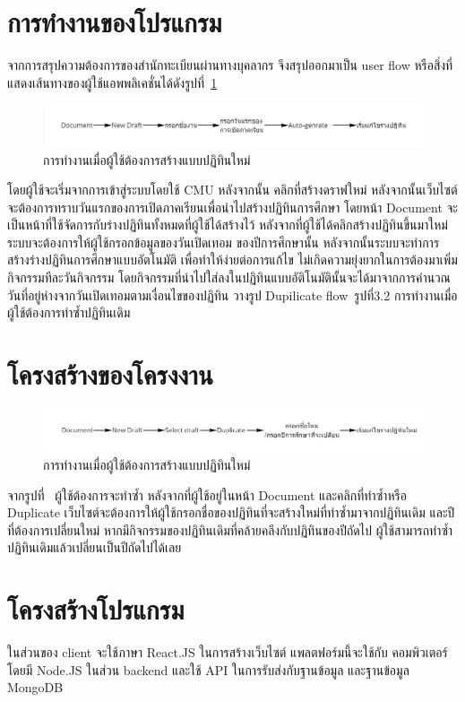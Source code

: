 \section{การทำงานของโปรแกรม}
จากการสรุปความต้องการของสำนักทะเบียนผ่านทางบุคลากร จึงสรุปออกมาเป็น user flow หรือสิ่งที่แสดงเส้นทางของผู้ใช้แอพพลิเคชั่นได้ดังรูปที่~\ref{fig:user-flow-new}

\begin{figure}[h]
\centering
\includegraphics[width=1\textwidth]{pic3.1.jpg}
\caption{การทำงานเมื่อผู้ใช้ต้องการสร้างแบบปฏิทินใหม่}
\label{fig:user-flow-new}
\end{figure}

โดยผู้ใช้จะเริ่มจากการเข้าสู่ระบบโดยใช้ CMU  หลังจากนั้น คลิกที่สร้างดราฟใหม่ 
หลังจากนั้นเว็บไซต์จะต้องการทราบวันแรกของการเปิดภาคเรียนเพื่อนำไปสร้างปฏิทินการศึกษา
โดยหน้า Document จะเป็นหน้าที่ใช้จัดการกับร่างปฏิทินทั้งหมดที่ผู้ใช้ได้สร้างไว้
หลังจากที่ผู้ใช้ได้คลิกสร้างปฏิทินขึ้นมาใหม่ ระบบจะต้องการให้ผู้ใช้กรอกข้อมูลของวันเปิดเทอม
ของปีการศึกษานั้น หลังจากนั้นระบบจะทำการสร้างร่างปฏิทินการศึกษาแบบอัตโนมัติ
เพื่อทำให้ง่ายต่อการแก้ไข ไม่เกิดความยุ่งยากในการต้องมาเพิ่มกิจกรรมทีละวันกิจกรรม
โดยกิจกรรมที่นำไปใส่ลงในปฏิทินแบบอัติโนมัตินั้นจะได้มาจากการคำนวณ
วันที่อยู่ห่างจากวันเปิดเทอมตามเงื่อนไขของปฏิทิน
 วางรูป Dupilicate flow\
 รูปที่3.2 การทำงานเมื่อผู้ใช้ต้องการทำซ้ำปฏิทินเดิม

\section{โครงสร้างของโครงงาน}

\begin{figure}[h]
\centering
\includegraphics[width=1\textwidth]{pic3.2.jpg}
\caption{การทำงานเมื่อผู้ใช้ต้องการสร้างแบบปฏิทินใหม่}
\end{figure}

จากรูปที่~ ผู้ใช้ต้องการจะทำซ้ำ หลังจากที่ผู้ใช้อยู่ในหน้า Document และคลิกที่ทำซ้ำหรือ Duplicate
เว็บไซต์จะต้องการให้ผู้ใช้กรอกชื่อของปฏิทินที่จะสร้างใหม่ที่ทำซ้ำมาจากปฏิทินเดิม
และปีที่ต้องการเปลี่ยนใหม่ หากมีกิจกรรมของปฏิทินเดิมที่คล้ายคลึงกับปฏิทินของปีถัดไป 
ผู้ใช้สามารถทำซ้ำปฏิทินเดิมแล้วเปลี่ยนเป็นปีถัดไปได้เลย

\section{โครงสร้างโปรแกรม}
ในส่วนของ client จะใช้ภาษา React.JS ในการสร้างเว็บไซต์ แพลตฟอร์มนี้จะใช้กับ
คอมพิวเตอร์ โดยมี Node.JS ในส่วน backend และใช้ API ในการรับส่งกับฐานข้อมูล
และฐานข้อมูล MongoDB
